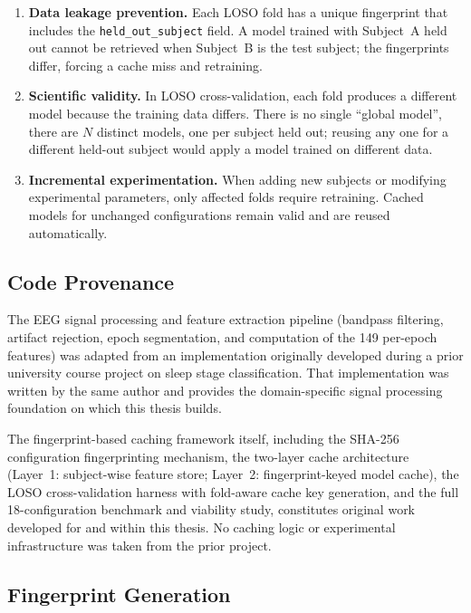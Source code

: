 \begin{enumerate}
 \item \textbf{Data leakage prevention.} Each LOSO fold has a unique fingerprint that includes the \texttt{held\_out\_subject} field. A model trained with Subject~A held out cannot be retrieved when Subject~B is the test subject; the fingerprints differ, forcing a cache miss and retraining.
 \item \textbf{Scientific validity.} In LOSO cross-validation, each fold produces a different model because the training data differs. There is no single ``global model'', there are $N$ distinct models, one per subject held out; reusing any one for a different held-out subject would apply a model trained on different data.
 \item \textbf{Incremental experimentation.} When adding new subjects or modifying experimental parameters, only affected folds require retraining. Cached models for unchanged configurations remain valid and are reused automatically.
\end{enumerate}

\subsection{Code Provenance}
\label{sec:code_provenance}

The EEG signal processing and feature extraction pipeline (bandpass filtering,
artifact rejection, epoch segmentation, and computation of the 149 per-epoch
features) was adapted from an implementation originally developed during a prior
university course project on sleep stage classification. That implementation
was written by the same author and provides the domain-specific signal
processing foundation on which this thesis builds.

The fingerprint-based caching framework itself, including the SHA-256
configuration fingerprinting mechanism, the two-layer cache architecture
(Layer~1: subject-wise feature store; Layer~2: fingerprint-keyed model cache),
the LOSO cross-validation harness with fold-aware cache key generation, and
the full 18-configuration benchmark and viability study, constitutes original
work developed for and within this thesis. No caching logic or experimental
infrastructure was taken from the prior project.

\subsection{Fingerprint Generation}
\label{sec:fingerprint_generation}

